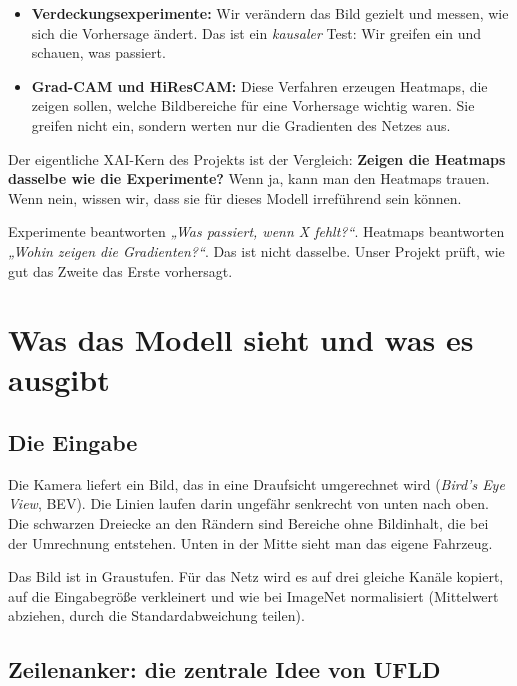 \documentclass[11pt,a4paper]{article}
\begin{document}
\begin{itemize}
  \item \textbf{Verdeckungsexperimente:} Wir verändern das Bild gezielt und messen, wie sich die
        Vorhersage ändert. Das ist ein \emph{kausaler} Test: Wir greifen ein und schauen, was
        passiert.
  \item \textbf{Grad-CAM und HiResCAM:} Diese Verfahren erzeugen Heatmaps, die zeigen sollen,
        welche Bildbereiche für eine Vorhersage wichtig waren. Sie greifen nicht ein, sondern
        werten nur die Gradienten des Netzes aus.
\end{itemize}

Der eigentliche XAI-Kern des Projekts ist der Vergleich: \textbf{Zeigen die Heatmaps dasselbe
wie die Experimente?} Wenn ja, kann man den Heatmaps trauen. Wenn nein, wissen wir, dass sie
für dieses Modell irreführend sein können.

\begin{merke}
Experimente beantworten \emph{„Was passiert, wenn X fehlt?“}. Heatmaps beantworten \emph{„Wohin
zeigen die Gradienten?“}. Das ist nicht dasselbe. Unser Projekt prüft, wie gut das Zweite das
Erste vorhersagt.
\end{merke}

\section{Was das Modell sieht und was es ausgibt}

\subsection{Die Eingabe}

Die Kamera liefert ein Bild, das in eine Draufsicht umgerechnet wird (\emph{Bird's Eye View},
BEV). Die Linien laufen darin ungefähr senkrecht von unten nach oben. Die schwarzen Dreiecke an den
Rändern sind Bereiche ohne Bildinhalt, die bei der Umrechnung entstehen. Unten in der Mitte sieht
man das eigene Fahrzeug.

Das Bild ist in Graustufen. Für das Netz wird es auf drei gleiche Kanäle kopiert, auf die
Eingabegröße verkleinert und wie bei ImageNet normalisiert (Mittelwert abziehen, durch die
Standardabweichung teilen).

\subsection{Zeilenanker: die zentrale Idee von UFLD}
\end{document}
